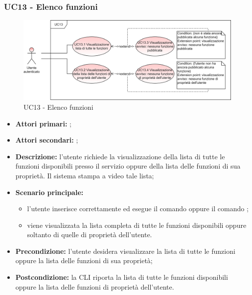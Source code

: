 \subsubsection{UC13 - Elenco funzioni}
\begin{figure}[H]
	\centering
	\includegraphics[scale=\ucs]{./res/img/UC13.png}
	\caption {UC13 - Elenco funzioni}
\end{figure}
\begin{itemize}
	\item \textbf{Attori primari:} \ua{};
	\item \textbf{Attori secondari:} \re{};
	\item \textbf{Descrizione:} l’utente richiede la visualizzazione della lista di tutte le funzioni disponibili presso il servizio oppure della lista delle funzioni di sua proprietà. Il sistema stampa a video tale lista;
	\item \textbf{Scenario principale:} 
	\begin{itemize}
		\item l'utente inserisce correttamente ed esegue il comando \lista{} oppure il comando \plista{};
		\item viene visualizzata la lista completa di tutte le funzioni disponibili oppure soltanto di quelle di proprietà dell’utente. 
	\end{itemize}
	\item \textbf{Precondizione:} l’utente desidera visualizzare la lista di tutte le funzioni oppure la lista delle funzioni di sua proprietà;
	\item \textbf{Postcondizione:} la CLI riporta la lista di tutte le funzioni disponibili oppure la lista delle funzioni di proprietà dell’utente.
\end{itemize}
